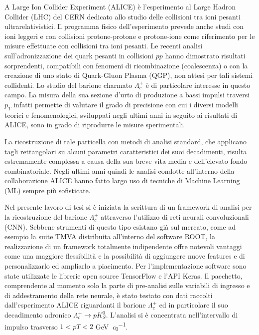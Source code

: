 A Large Ion Collider Experiment (ALICE) è l’esperimento al Large Hadron Collider (LHC) del CERN dedicato allo studio delle collisioni tra ioni pesanti ultrarelativistici. Il programma fisico dell’esperimento prevede anche studi con ioni leggeri e con collisioni protone-protone e protone-ione come riferimento per le misure effettuate con collisioni tra ioni pesanti. Le recenti analisi sull’adronizzazione dei quark pesanti in collisioni $pp$ hanno dimostrato risultati sorprendenti, compatibili con fenomeni di ricombinazione (coalescenza) o con la creazione di uno stato di Quark-Gluon Plasma (QGP), non attesi per tali sistemi collidenti. Lo studio del barione charmato $\Lambda^{+}_{c}$ è di particolare interesse in questo campo. La misura della sua sezione d’urto di produzione a bassi impulsi traversi $p_{T}$ infatti permette di valutare il grado di precisione con cui i diversi modelli teorici e fenomenologici, sviluppati negli ultimi anni in seguito ai risultati di ALICE, sono in grado di riprodurre le misure sperimentali.

La ricostruzione di tale particella con metodi di analisi standard, che applicano tagli rettangolari su alcuni parametri caratteristici dei suoi decadimenti, risulta estremamente complessa a causa della sua breve vita media e dell’elevato fondo combinatoriale. Negli ultimi anni quindi le analisi condotte all’interno della collaborazione ALICE hanno fatto largo uso di tecniche di Machine Learning (ML) sempre più sofisticate. 

Nel presente lavoro di tesi si è iniziata la scrittura di un framework di analisi per la ricostruzione del barione $\Lambda_{c}^{+}$ attraverso l’utilizzo di reti neurali convoluzionali (CNN). Sebbene strumenti di questo tipo esistano già sul mercato, come ad esempio la suite TMVA distribuita all’interno del software ROOT, la realizzazione di un framework totalmente indipendente offre notevoli vantaggi come una maggiore flessibilità e la possibilità di aggiungere nuove features e di personalizzarlo ed ampliarlo a piacimento. Per l’implementazione software sono state utilizzate le librerie open source TensorFlow e l’API Keras. Il pacchetto, comprendente al momento solo la parte di pre-analisi sulle variabili di ingresso e di addestramento della rete neurale, è stato testato con dati raccolti dall’esperimento ALICE riguardanti il barione $\Lambda_{c}^{+}$ ed in particolare il suo decadimento adronico $\Lambda_{c}^{+} \to p K^{0}_{S}$. L’analisi si è concentrata nell’intervallo di impulso trasverso $1 < pT < 2$ \unit{\giga \eV \per \clight}. 

